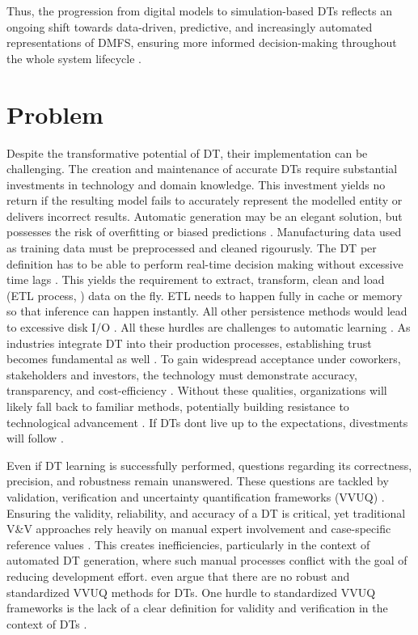 Thus, the progression from digital models to simulation-based DTs reflects an ongoing shift towards data-driven, predictive, and increasingly automated representations of DMFS, ensuring more informed decision-making throughout the whole system lifecycle \parencite{boschert2016digital,lim2020state}.

\section{Problem}
Despite the transformative potential of DT, their implementation can be challenging. The creation and maintenance of accurate DTs require substantial investments in technology and domain knowledge. This investment yields no return if the resulting model fails to accurately represent the modelled entity or delivers incorrect results. Automatic generation may be an elegant solution, but possesses the risk of overfitting or biased predictions \parencite{gemanbias}. Manufacturing data used as training data must be preprocessed and cleaned rigourusly. The DT per definition has to be able to perform real-time decision making without excessive time lags \parencite{buildings11040151}. This yields the requirement to extract, transform, clean and load (ETL process, \cite{vassiliadis2002conceptual}) data on the fly. ETL needs to happen fully in cache or memory so that inference can happen instantly. All other persistence methods would lead to excessive disk I/O \parencite{mandala2024etl}.
All these hurdles are challenges to automatic learning \parencite{ribeiro2016should,zhao2024data}. As industries integrate DT into their production processes, establishing trust becomes fundamental as well \parencite{trauer2022digital,arrieta2020explainable}. To gain widespread acceptance under coworkers, stakeholders and investors, the technology must demonstrate accuracy, transparency, and cost-efficiency \parencite{Wright2020amse,Shao2023mfglet}. Without these qualities, organizations will likely fall back to familiar methods, potentially building resistance to technological advancement \parencite{lapointe2005multilevel}. If DTs dont live up to the expectations, divestments will follow \parencite{cognizant2020divestitures}.

Even if DT learning is successfully performed, questions regarding its correctness, precision, and robustness remain unanswered. These questions are tackled by validation, verification and uncertainty quantification frameworks (VVUQ) \parencite{sel2025survey}. Ensuring the validity, reliability, and accuracy of a DT is critical, yet traditional V&V approaches rely heavily on manual expert involvement and case-specific reference values \parencite{Bitencourt2023,hua2022validation}. This creates inefficiencies, particularly in the context of automated DT generation, where such manual processes conflict with the goal of reducing development effort. \citeauthor{hua2022validation} even argue that there are no robust and standardized VVUQ methods for DTs. One hurdle to standardized VVUQ frameworks is the lack of a clear definition for validity and verification in the context of DTs \parencite{Bitencourt2023}.

